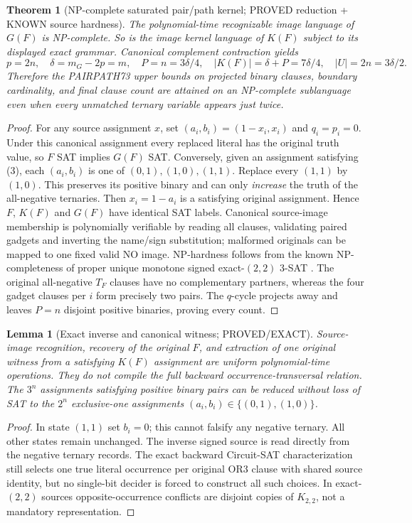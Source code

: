 \documentclass[11pt]{article}
\newtheorem{theorem}{Theorem}
\newtheorem{lemma}{Lemma}
\begin{document}
\begin{theorem}[NP-complete saturated pair/path kernel; PROVED reduction + KNOWN source hardness]
The polynomial-time recognizable image language of $G(F)$ is NP-complete. So is the image kernel language of $K(F)$ subject to its displayed exact grammar. Canonical complement contraction yields
\[
p=2n,\quad \delta=m_G-2p=m,\quad P=n=3\delta/4,
\quad |K(F)|=\delta+P=7\delta/4,\quad |U|=2n=3\delta/2.
\]
Therefore the PAIRPATH73 upper bounds on projected binary clauses, boundary cardinality, and final clause count are attained on an NP-complete sublanguage even when every unmatched ternary variable appears just twice.
\end{theorem}
\begin{proof}
For any source assignment $x$, set $(a_i,b_i)=(1-x_i,x_i)$ and $q_i=p_i=0$. Under this canonical assignment every replaced literal has the original truth value, so $F$ SAT implies $G(F)$ SAT. Conversely, given an assignment satisfying (3), each $(a_i,b_i)$ is one of $(0,1),(1,0),(1,1)$. Replace every $(1,1)$ by $(1,0)$. This preserves its positive binary and can only \emph{increase} the truth of the all-negative ternaries. Then $x_i=1-a_i$ is a satisfying original assignment. Hence $F$, $K(F)$ and $G(F)$ have identical SAT labels. Canonical source-image membership is polynomially verifiable by reading all clauses, validating paired gadgets and inverting the name/sign substitution; malformed originals can be mapped to one fixed valid NO image. NP-hardness follows from the known NP-completeness of proper unique monotone signed exact-$(2,2)$ 3-SAT \cite{docker}. The original all-negative $T_F$ clauses have no complementary partners, whereas the four gadget clauses per $i$ form precisely two pairs. The $q$-cycle projects away and leaves $P=n$ disjoint positive binaries, proving every count.
\end{proof}

\begin{lemma}[Exact inverse and canonical witness; PROVED/EXACT]
Source-image recognition, recovery of the original $F$, and extraction of \emph{one} original witness from a satisfying $K(F)$ assignment are uniform polynomial-time operations. They do not compile the full backward occurrence-transversal relation. The $3^n$ assignments satisfying positive binary pairs can be reduced without loss of SAT to the $2^n$ exclusive-one assignments $(a_i,b_i)\in\{(0,1),(1,0)\}$.
\end{lemma}
\begin{proof}
In state $(1,1)$ set $b_i=0$; this cannot falsify any negative ternary. All other states remain unchanged. The inverse signed source is read directly from the negative ternary records. The exact backward Circuit-SAT characterization still selects one true literal occurrence per original OR3 clause with shared source identity, but no single-bit decider is forced to construct all such choices. In exact-$(2,2)$ sources opposite-occurrence conflicts are disjoint copies of $K_{2,2}$, not a mandatory representation.
\end{proof}
\end{document}
